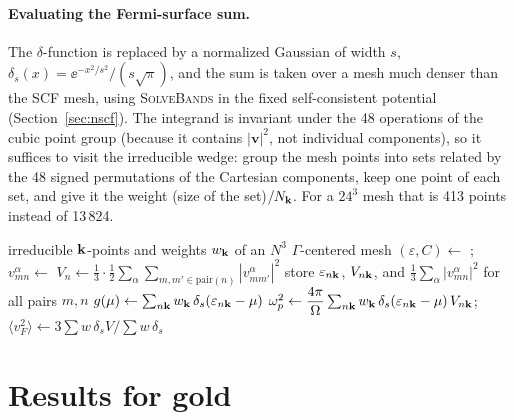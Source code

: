\paragraph{Evaluating the Fermi-surface sum.} The $\delta$-function is
replaced by a normalized Gaussian of width $s$,
$\delta_s(x) = \ee^{-x^2/s^2}/(s\sqrt\pi)$, and the sum is taken over a
mesh much denser than the SCF mesh, using \textsc{SolveBands} in the fixed
self-consistent potential (Section~\ref{sec:nscf}). The integrand is
invariant under the 48 operations of the cubic point group (because it
contains $|\mathbf v|^2$, not individual components), so it suffices to
visit the irreducible wedge: group the mesh points into sets related by
the 48 signed permutations of the Cartesian components, keep one point of
each set, and give it the weight (size of the set)$/N_{\mathbf{k}}$. For a
$24^3$ mesh that is 413 points instead of 13\,824.

\begin{algorithm}[H]
\caption{Drude weight, density of states and Fermi velocity}
\label{alg:drude}
\begin{algorithmic}[1]
\State irreducible $\mathbf{k}$-points and weights $w_{\mathbf{k}}$ of an $N^3$
$\Gamma$-centered mesh
\State $(\varepsilon, C) \gets$ ;\quad
$v^\alpha_{mn} \gets$ 
\State $V_n \gets \tfrac13\cdot\tfrac12\sum_\alpha\sum_{m,m'\in
\text{pair}(n)}|v^\alpha_{mm'}|^2$ 
\State store $\varepsilon_{n\mathbf{k}}$, $V_{n\mathbf{k}}$, and
$\tfrac13\sum_\alpha|v^\alpha_{mn}|^2$ for all pairs $m,n$
\EndFor
\State $g(\mu) \gets \sum_{n\mathbf{k}}w_{\mathbf{k}}\,\delta_s(\varepsilon_{n\mathbf{k}}-\mu)$
\State $\omega_p^2 \gets \dfrac{4\pi}{\Omega}\sum_{n\mathbf{k}}w_{\mathbf{k}}\,
\delta_s(\varepsilon_{n\mathbf{k}}-\mu)\,V_{n\mathbf{k}}$;\quad
$\langle v_F^2\rangle \gets 3\sum w\,\delta_s V\big/\sum w\,\delta_s$
\end{algorithmic}
\end{algorithm}

\section{Results for gold}

